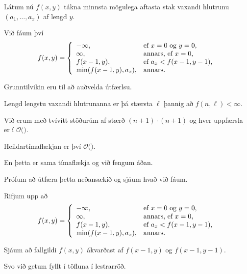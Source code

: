 {
    {
        \item<1-> Látum nú $f(x, y)$ tákna minnsta mögulega aftasta stak vaxandi hlutrunu $(a_1, \dots, a_x)$ af lengd $y$.
        \item<2-> Við fáum því
        \[
            f(x, y) = \left \{
            \env{array}
            { {l l}
                -\infty, & \text{ef $x = 0$ og $y = 0$,} \\
                \infty, & \text{annars, ef $x = 0$,} \\
                f(x - 1, y), & \text{ef $a_x < f(x - 1, y - 1)$,} \\
                \min(f(x - 1, y), a_x), & \text{annars.}
            }
            \right .
        \]
        \item<3-> Grunntilvikin eru til að auðvelda útfærlsu.
        \item<4-> Lengd lengstu vaxandi hlutrunanna er þá stærsta $\ell$ þannig að $f(n, \ell) < \infty$.
    }
}

{
}

{
    {
        \item<1-> Við erum með tvívítt stöðurúm af stærð $(n + 1) \cdot (n + 1)$ og hver uppfærsla er í $\mathcal{O}($$)$.
        \item<3-> Heildartímaflækjan er því $\mathcal{O}($$)$.
        \item<5-> En þetta er sama tímaflækja og við fengum áðan.
        \item<6-> Prófum að útfæra þetta neðansækið og sjáum hvað við fáum.
    }
}

{
    {
        \item<1-> Rifjum upp að
        \[
            f(x, y) = \left \{
            \env{array}
            { {l l}
                -\infty, & \text{ef $x = 0$ og $y = 0$,} \\
                \infty, & \text{annars, ef $x = 0$,} \\
                f(x - 1, y), & \text{ef $a_x < f(x - 1, y - 1)$,} \\
                \min(f(x - 1, y), a_x), & \text{annars.}
            }
            \right .
        \]
        \item<2-> Sjáum að fallgildi $f(x, y)$ ákvarðast af $f(x - 1, y)$ og $f(x - 1, y - 1)$.
        \item<3-> Svo við getum fyllt í töfluna í lestrarröð.
    }
}


